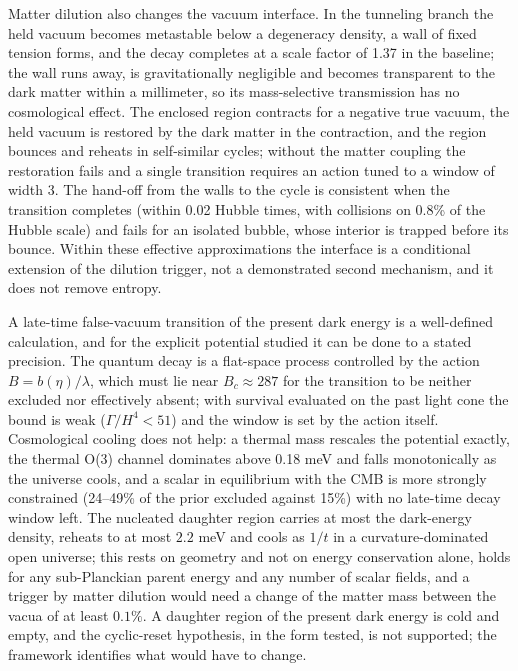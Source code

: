 \documentclass[11pt,a4paper]{article}
\begin{document}
Matter dilution also changes the vacuum interface. In the tunneling branch the held vacuum becomes metastable below a degeneracy density, a wall of fixed tension forms, and the decay completes at a scale factor of 1.37 in the baseline; the wall runs away, is gravitationally negligible and becomes transparent to the dark matter within a millimeter, so its mass-selective transmission has no cosmological effect. The enclosed region contracts for a negative true vacuum, the held vacuum is restored by the dark matter in the contraction, and the region bounces and reheats in self-similar cycles; without the matter coupling the restoration fails and a single transition requires an action tuned to a window of width 3. The hand-off from the walls to the cycle is consistent when the transition completes (within 0.02 Hubble times, with collisions on 0.8\% of the Hubble scale) and fails for an isolated bubble, whose interior is trapped before its bounce. Within these effective approximations the interface is a conditional extension of the dilution trigger, not a demonstrated second mechanism, and it does not remove entropy.

A late-time false-vacuum transition of the present dark energy is a well-defined calculation, and for the explicit potential studied it can be done to a stated precision. The quantum decay is a flat-space process controlled by the action $B=b(\eta)/\lambda$, which must lie near $B_c\approx287$ for the transition to be neither excluded nor effectively absent; with survival evaluated on the past light cone the bound is weak ($\Gamma/H^4<51$) and the window is set by the action itself. Cosmological cooling does not help: a thermal mass rescales the potential exactly, the thermal O(3) channel dominates above 0.18 meV and falls monotonically as the universe cools, and a scalar in equilibrium with the CMB is more strongly constrained (24--49\% of the prior excluded against 15\%) with no late-time decay window left. The nucleated daughter region carries at most the dark-energy density, reheats to at most $2.2$ meV and cools as $1/t$ in a curvature-dominated open universe; this rests on geometry and not on energy conservation alone, holds for any sub-Planckian parent energy and any number of scalar fields, and a trigger by matter dilution would need a change of the matter mass between the vacua of at least $0.1\%$. A daughter region of the present dark energy is cold and empty, and the cyclic-reset hypothesis, in the form tested, is not supported; the framework identifies what would have to change.
\end{document}
